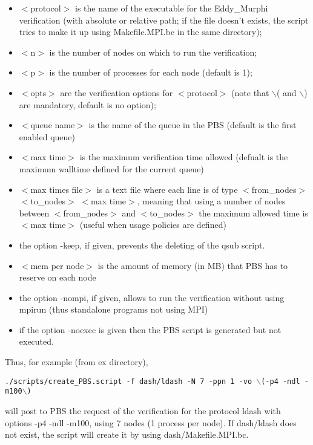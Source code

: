 \documentclass{article}
\begin{document}
\begin{itemize}

	\item $<$protocol$>$ is the name of the executable for the Eddy\_Murphi
verification (with absolute or relative path; if the file doesn't exists, the
script tries to make it up using Makefile.MPI.bc in the same directory);

	\item $<$n$>$ is the number of nodes on which to run the verification;

	\item $<$p$>$ is the number of processes for each node (default is 1);

	\item $<$opts$>$ are the verification options for $<$protocol$>$ (note
that $\backslash$( and $\backslash$) are mandatory, default is no option);

	\item $<$queue name$>$ is the name of the queue in the PBS (default is
the first enabled queue)

	\item $<$max time$>$ is the maximum verification time allowed (defualt
is the maximum walltime defined for the current queue)

	\item $<$max times file$>$ is a text file where each line is of type 
$<$from\_nodes$>$ $<$to\_nodes$>$ $<$max time$>$, meaning that using a number of
nodes between  $<$from\_nodes$>$ and $<$to\_nodes$>$ the maximum allowed time is
$<$max time$>$ (useful when usage policies are defined)

	\item the option -keep, if given, prevents the deleting of the qsub
script.

	\item $<$mem per node$>$ is the amount of memory (in MB) that PBS has to
reserve on each node

	\item the option -nompi, if given, allows to run the verification
without using mpirun (thus standalone programs not using MPI)

	\item if the option -noexec is given then the PBS script is generated
but not executed.

\end{itemize}

Thus, for example (from ex directory),

{\tt ./scripts/create\_PBS.script -f dash/ldash -N 7 -ppn 1 -vo $\backslash$(-p4
-ndl -m100$\backslash$)}

will post to PBS the request of the verification for the protocol ldash with
options -p4 -ndl -m100, using 7 nodes (1 process per node). If dash/ldash does
not exist, the script will create it by using dash/Makefile.MPI.bc.
\end{document}
